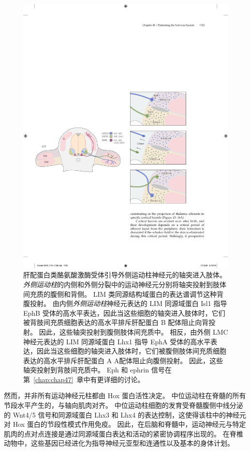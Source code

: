 \begin{figure}[htbp]
	\centering
	\includegraphics[width=1.0\linewidth]{chap45/fig_45_14}
	\caption{肝配蛋白类酪氨酸激酶受体引导外侧运动柱神经元的轴突进入肢体。
		\textit{外侧运动柱}的内侧和外侧分裂中的运动神经元分别将轴突投射到肢体间充质的腹侧和背侧。
		LIM 类同源结构域蛋白的表达谱调节这种背腹投射。 
		由内侧\textit{外侧运动柱}神经元表达的 LIM 同源域蛋白 Isl1 指导 EphB 受体的高水平表达，因此当这些细胞的轴突进入肢体时，它们被背肢间充质细胞表达的高水平排斥肝配蛋白 B 配体阻止向背投射。
		因此，这些轴突投射到腹侧肢体间充质中。
		相反，由外侧 LMC 神经元表达的 LIM 同源域蛋白 Lhx1 指导 EphA 受体的高水平表达，因此当这些细胞的轴突进入肢体时，它们被腹侧肢体间充质细胞表达的高水平排斥肝配蛋白 A A配体阻止向腹侧投射。
		因此，这些轴突投射到背肢间充质中。
		Eph 和 ephrin 信号在第~\ref{chap:chap47}~章中有更详细的讨论。}
	\label{fig:45_14}
\end{figure}


然而，并非所有运动神经元柱都由 Hox 蛋白活性决定。
中位运动柱在脊髓的所有节段水平产生的，与轴向肌肉对齐。
中位运动柱细胞的发育受脊髓腹侧中线分泌的 Wnt4/5 信号和同源域蛋白 Lhx3 和 Lhx4 的表达控制，这使得该柱中的神经元对 Hox 蛋白的节段性模式作用免疫。
因此，在后脑和脊髓中，运动神经元与特定肌肉的点对点连接是通过同源域蛋白表达和活动的紧密协调程序出现的。
在脊椎动物中，这些基因已经进化为指导神经元亚型和连通性以及基本的身体计划。



